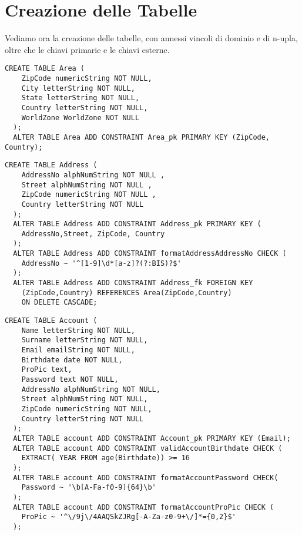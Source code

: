 \section{Creazione delle Tabelle}

Vediamo ora la creazione delle tabelle, con annessi vincoli di dominio e di n-upla, oltre che le chiavi primarie e le chiavi esterne.

\begin{lstlisting}[caption={Creazione della tabella \textbf{Area}}]
  CREATE TABLE Area (
    ZipCode numericString NOT NULL,
    City letterString NOT NULL,
    State letterString NOT NULL,
    Country letterString NOT NULL,
    WorldZone WorldZone NOT NULL
  );
  ALTER TABLE Area ADD CONSTRAINT Area_pk PRIMARY KEY (ZipCode, Country);
\end{lstlisting}

\begin{lstlisting}[caption={Creazione della tabella \textbf{Address}}]
  CREATE TABLE Address (
    AddressNo alphNumString NOT NULL ,
    Street alphNumString NOT NULL ,
    ZipCode numericString NOT NULL ,
    Country letterString NOT NULL
  );
  ALTER TABLE Address ADD CONSTRAINT Address_pk PRIMARY KEY (
    AddressNo,Street, ZipCode, Country
  );
  ALTER TABLE Address ADD CONSTRAINT formatAddressAddressNo CHECK (
    AddressNo ~ '^[1-9]\d*[a-z]?(?:BIS)?$'
  );
  ALTER TABLE Address ADD CONSTRAINT Address_fk FOREIGN KEY 
    (ZipCode,Country) REFERENCES Area(ZipCode,Country) 
    ON DELETE CASCADE;
\end{lstlisting}
\begin{lstlisting}[caption={Creazione della tabella \textbf{Account}}]
  CREATE TABLE Account (
    Name letterString NOT NULL,
    Surname letterString NOT NULL,
    Email emailString NOT NULL,
    Birthdate date NOT NULL,
    ProPic text,
    Password text NOT NULL,
    AddressNo alphNumString NOT NULL,
    Street alphNumString NOT NULL,
    ZipCode numericString NOT NULL,
    Country letterString NOT NULL
  );
  ALTER TABLE account ADD CONSTRAINT Account_pk PRIMARY KEY (Email);
  ALTER TABLE account ADD CONSTRAINT validAccountBirthdate CHECK (
    EXTRACT( YEAR FROM age(Birthdate)) >= 16 
  );
  ALTER TABLE account ADD CONSTRAINT formatAccountPassword CHECK(
    Password ~ '\b[A-Fa-f0-9]{64}\b'
  );
  ALTER TABLE account ADD CONSTRAINT formatAccountProPic CHECK (
    ProPic ~ '^\/9j\/4AAQSkZJRg[-A-Za-z0-9+\/]*={0,2}$'
  );
\end{lstlisting}
   
